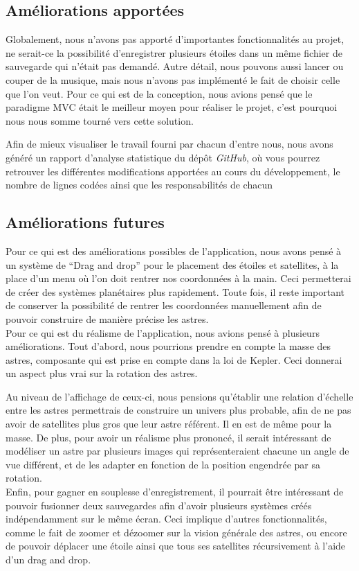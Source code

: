 \documentclass[a4paper,10pt]{article}
\begin{document}
\subsection{Améliorations apportées}
Globalement, nous n'avons pas apporté d'importantes fonctionnalités au projet, ne serait-ce la possibilité d'enregistrer plusieurs étoiles dans un même fichier de sauvegarde qui n'était pas demandé. Autre détail, nous pouvons aussi lancer ou couper de la musique, mais nous n'avons pas implémenté le fait de choisir celle que l'on veut. Pour ce qui est de la conception, nous avions pensé que le paradigme MVC était le meilleur moyen pour réaliser le projet, c'est pourquoi nous nous somme tourné vers cette solution. 

Afin de mieux visualiser le travail fourni par chacun d'entre nous, nous avons généré un rapport d'analyse statistique du dépôt \textit{GitHub}, où vous pourrez retrouver les différentes modifications apportées au cours du développement, le nombre de lignes codées ainsi que les responsabilités de chacun

\subsection{Améliorations futures}
Pour ce qui est des améliorations possibles de l'application, nous avons pensé à un système de ``Drag and drop'' pour le placement des étoiles et satellites, à la place d'un menu où l'on doit rentrer nos coordonnées à la main. Ceci permetterai de créer des systèmes planétaires plus rapidement. Toute fois, il reste important de conserver la possibilité de rentrer les coordonnées manuellement afin de pouvoir construire de manière précise les astres.\\

Pour ce qui est du réalisme de l'application, nous avions pensé à plusieurs améliorations. Tout d'abord, nous pourrions prendre en compte la masse des astres, composante qui est prise en compte dans la loi de Kepler. Ceci donnerai un aspect plus vrai sur la rotation des astres. 

Au niveau de l'affichage de ceux-ci, nous pensions qu'établir une relation d'échelle entre les astres permettrais de construire un univers plus probable, afin de ne pas avoir de satellites plus gros que leur astre référent. Il en est de même pour la masse. De plus, pour avoir un réalisme plus prononcé, il serait intéressant de modéliser un astre par plusieurs images qui représenteraient chacune un angle de vue différent, et de les adapter en fonction de la position engendrée par sa rotation.\\

Enfin, pour gagner en souplesse d'enregistrement, il pourrait être intéressant de pouvoir fusionner deux sauvegardes afin d'avoir plusieurs systèmes créés indépendamment sur le même écran. Ceci implique d'autres fonctionnalités, comme le fait de zoomer et dézoomer sur la vision générale des astres, ou encore de pouvoir déplacer une étoile ainsi que tous ses satellites récursivement à l'aide d'un drag and drop.
\end{document}
